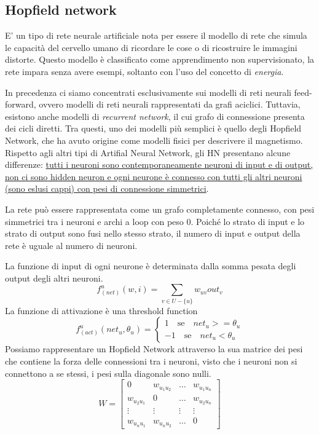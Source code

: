 \subsection{Hopfield network}
E' un tipo di rete neurale artificiale nota per essere il modello di rete che simula le capacità del cervello umano di ricordare le cose o di ricostruire le immagini distorte. Questo modello è classificato come apprendimento non supervisionato, la rete impara senza avere esempi, soltanto con l'uso del concetto di \textit{energia}.

In precedenza ci siamo concentrati esclusivamente sui modelli di reti neurali feed-forward, ovvero modelli di reti neurali rappresentati da grafi aciclici. Tuttavia, esistono anche modelli di \textit{recurrent network}, il cui grafo di connessione presenta dei cicli diretti. Tra questi, uno dei modelli più semplici è quello degli Hopfield Network, che ha avuto origine come modelli fisici per descrivere il magnetismo. Rispetto agli altri tipi di Artifial Neural Network, gli HN presentano alcune differenze: \uline{tutti i neuroni sono contemporaneamente neuroni di input e di output, non ci sono hidden neuron e ogni neurone è connesso con tutti gli altri neuroni (sono eslusi cappi) con pesi di connessione simmetrici}. 

La rete può essere rappresentata come un grafo completamente connesso, con pesi simmetrici tra i neuroni e archi a loop con peso $0$. Poiché lo strato di input e lo strato di output sono fusi nello stesso strato, il numero di input e output della rete è uguale al numero di neuroni.

La funzione di input di ogni neurone è determinata dalla somma pesata degli output degli altri neuroni.
$$f_{(net)}^u(w,i) = \sum_{v \in U - \{u\}} w_{uv} out_v $$
La funzione di attivazione è una threshold function
$$
f_{(act)}^u(net_u,\theta_u) = 
    \begin{cases}
	1 \quad \text{se} \quad net_u >= \theta_u \\
        -1 \quad \text{se} \quad net_u < \theta_u
    \end{cases}
$$
Possiamo rappresentare un Hopfield Network attraverso la sua matrice dei pesi che contiene la forza delle connessioni tra i neuroni, visto che i neuroni non si connettono a se stessi, i pesi sulla diagonale sono nulli.
$$
W = \begin{bmatrix} 
        0 & w_{u_1 u_2} & \dots & w_{u_1 u_n} \\
        w_{u_2 u_1} & 0 & \dots & w_{u_2 u_n} \\
        \vdots & \vdots & \vdots & \vdots \\
        w_{u_n u_1} & w_{u_n u_2} & \dots & 0
     \end{bmatrix}
$$

